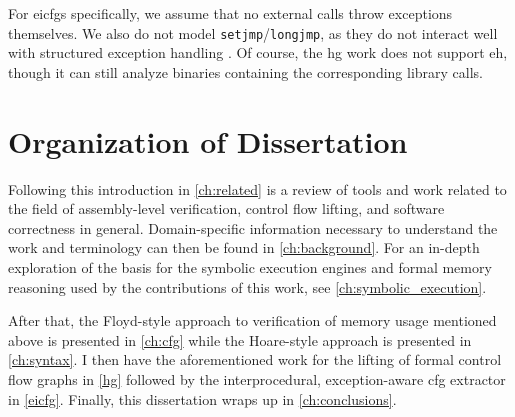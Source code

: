 For \acp{eicfg} specifically, we assume that no external calls throw exceptions themselves.
We also do not model \lstinline|setjmp|/\lstinline|longjmp|, as they do not interact well with structured exception handling \autocite{using-setjmp-and-longjmp}.
Of course, the \ac{hg} work does not support \ac{eh}, though it can still analyze binaries containing the corresponding library calls.

\begin{comment}
  Hiding for now as Dr.~Ravindran agreed this is kind of redundant with the contributions. Freek seems fine without it too.
  \section{Impact}
  \todo{What are the results? What can these contributions be used for? Seems kind of redundant with the contributions subsection though.}

  \subsection{Memory Usage}

  \subsection{Control Flow Recovery}
\end{comment}

\section{Organization of Dissertation}
Following this introduction in \cref{ch:related} is a review of tools and work related to the field of assembly-level verification, control flow lifting, and software correctness in general.
Domain-specific information necessary to understand the work and terminology can then be found in \cref{ch:background}.
For an in-depth exploration of the basis for the symbolic execution engines and formal memory reasoning used by the contributions of this work,
see \cref{ch:symbolic_execution}.

After that, the Floyd-style approach to verification of memory usage mentioned above is presented in \cref{ch:cfg} while the Hoare-style approach is presented in \cref{ch:syntax}.
I then have the aforementioned work for the lifting of formal control flow graphs in \cref{hg}
followed by the interprocedural, exception-aware \ac{cfg} extractor in \cref{eicfg}.
Finally, this dissertation wraps up in \cref{ch:conclusions}.

